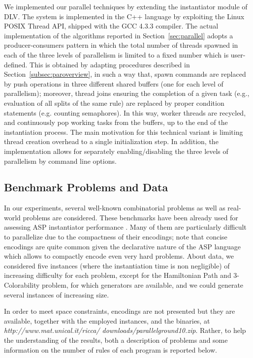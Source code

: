 \documentclass[preprint]{tlp}
\newcommand{\dlv}{{\sc DLV}\xspace}
\begin{document}
We implemented our parallel techniques by extending the instantiator module of \dlv.
The system is implemented in the C{\small ++} language by exploiting the Linux POSIX Thread API,
shipped with the GCC 4.3.3 compiler.
The actual implementation of the algorithms reported in Section~\ref{sec:parallel}
adopts a producer-consumers pattern in which the total number of threads spawned in each
of the three levels of parallelism is limited to a fixed number which is user-defined.
This is obtained by adapting procedures described in Section~\ref{subsec:paroverview},
in such a way that, spawn commands are replaced by push operations in three different shared buffers (one for each level of parallelism);
moreover, thread joins ensuring the completion of a given task (e.g., evaluation of all splits of the same rule)
are replaced by proper condition statements (e.g. counting semaphores).
In this way, worker threads are recycled, and continuously pop working tasks from the buffers, up to the end of the instantiation process.
The main motivation for this technical variant is limiting thread creation overhead to a single initialization step.
In addition, the implementation allows for separately enabling/disabling the three levels of parallelism by command line options.

\subsection{Benchmark Problems and Data}
In our experiments, several well-known combinatorial problems as well as real-world problems are considered.
These benchmarks have been already used for assessing ASP instantiator
performance \cite{leon-etal-2002-dlv,gebs-etal-2007-lpnmr-competition,devebogetr09a}.
Many of them are particularly difficult to parallelize
due to the compactness of their encodings;
note that concise encodings are quite common given
the declarative nature of the ASP language which allows to compactly
encode even very hard problems.
About data, we considered five instances (where the instantiation time is non negligible) of
increasing difficulty for each problem, except for the Hamiltonian Path and
3-Colorability problem, for which generators are available,
and we could generate several instances of increasing size.

In order  to meet space constraints, encodings are not
presented but they are available, together with the employed
instances, and the binaries, at
{\em http://www.mat.unical.it/ricca/ downloads/parallelground10.zip}. Rather,
to help the understanding of the results, both a description of problems and some information
on the number of rules of each program is reported below.
\end{document}
